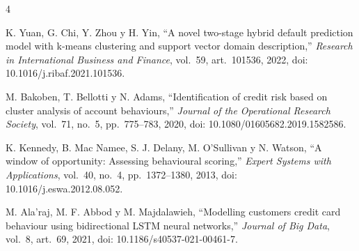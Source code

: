 \documentclass[journal]{IEEEtran}
\begin{document}
\begin{thebibliography}{4}

K. Yuan, G. Chi, Y. Zhou y H. Yin, ``A novel two-stage hybrid default prediction model with k-means clustering and support vector domain description,'' \emph{Research in International Business and Finance}, vol.~59, art.~101536, 2022, doi: 10.1016/j.ribaf.2021.101536.

M. Bakoben, T. Bellotti y N. Adams, ``Identification of credit risk based on cluster analysis of account behaviours,'' \emph{Journal of the Operational Research Society}, vol.~71, no.~5, pp.~775--783, 2020, doi: 10.1080/01605682.2019.1582586.

K. Kennedy, B. Mac Namee, S. J. Delany, M. O'Sullivan y N. Watson, ``A window of opportunity: Assessing behavioural scoring,'' \emph{Expert Systems with Applications}, vol.~40, no.~4, pp.~1372--1380, 2013, doi: 10.1016/j.eswa.2012.08.052.

M. Ala'raj, M. F. Abbod y M. Majdalawieh, ``Modelling customers credit card behaviour using bidirectional LSTM neural networks,'' \emph{Journal of Big Data}, vol.~8, art.~69, 2021, doi: 10.1186/s40537-021-00461-7.

\end{thebibliography}
\end{document}

